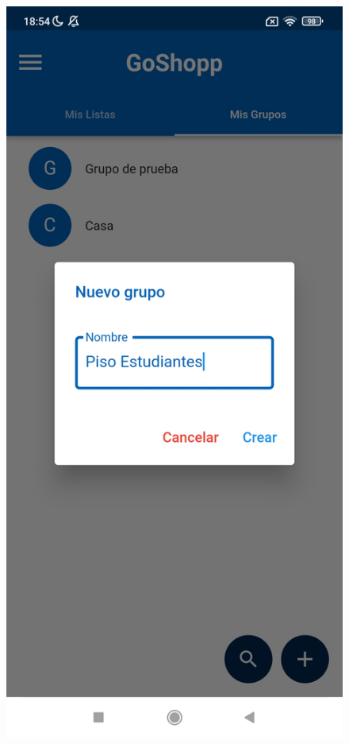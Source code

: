 \documentclass{article}
\begin{document}
\begin{figure}[h]
    \centering
    \begin{minipage}[h]{0.32\textwidth}
        \includegraphics[width=\textwidth]{imagenes/pantallas/grupos/modal_crear_grupo.jpg}

\end{minipage}
\end{figure}
\end{document}
